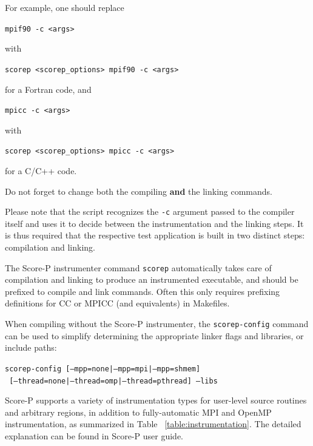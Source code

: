 \documentclass[11pt,oneside,a4paper]{book}
\newenvironment{code}%
{
\addtolength{\leftskip}{0.5cm}}%
{

}
\begin{document}
For example, one should replace

\begin{code}
\texttt{mpif90 -c <args> }
\end{code}

with

\begin{code}
\texttt{scorep <scorep\_options> mpif90 -c <args>}
\end{code}

for a Fortran code, and

\begin{code}
\texttt{mpicc -c <args> }
\end{code}

with

\begin{code}
\texttt{scorep <scorep\_options> mpicc -c <args>}
\end{code}

for a C/C++ code.

Do not forget to change both the compiling \textbf{and} the linking commands.

Please note that the script recognizes the \texttt{-c} argument passed to the compiler itself and uses it to decide between the instrumentation and the linking steps. It is thus required that the respective test application is built in two distinct steps: compilation and linking.

The Score-P instrumenter command \texttt{scorep} automatically takes care of compilation and linking to produce an instrumented executable, and should be prefixed to
compile and link commands. Often this only requires prefixing definitions for CC
or MPICC (and equivalents) in Makefiles.

When compiling without the Score-P instrumenter, the \texttt{scorep-config} command can be used to simplify determining the appropriate linker flags and libraries, or include paths:

\texttt{scorep-config [--mpp=none|--mpp=mpi|--mpp=shmem]}\\
\texttt{ [--thread=none|--thread=omp|--thread=pthread] --libs}

Score-P supports a variety of instrumentation types for user-level source routines and arbitrary regions, in addition to fully-automatic MPI and OpenMP instrumentation, as summarized in Table
~\ref{table:instrumentation}. The detailed explanation can be found in Score-P user guide.
\end{document}
